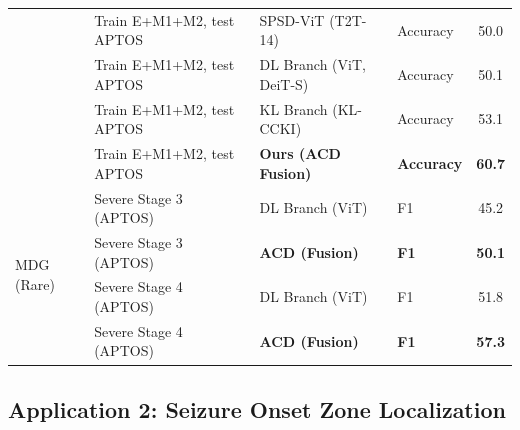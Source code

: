 \documentclass[runningheads]{llncs}
\begin{document}
\begin{table}[h]
\begin{tabular}{llllc}
  & Train E+M1+M2, test APTOS 
  & SPSD-ViT (T2T-14) & Accuracy & 50.0 \\
  & Train E+M1+M2, test APTOS 
  & DL Branch (ViT, DeiT-S) & Accuracy & 50.1 \\
  & Train E+M1+M2, test APTOS 
  & KL Branch (KL-CCKI) & Accuracy & 53.1 \\
  & Train E+M1+M2, test APTOS 
  & \textbf{Ours (ACD Fusion)} & \textbf{Accuracy} & \textbf{60.7} \\
\midrule
\multirow{4}{*}{MDG (Rare)} 
  & Severe Stage 3 (APTOS) 
  & DL Branch (ViT) & F1 & 45.2 \\
  & Severe Stage 3 (APTOS) 
  & \textbf{ACD (Fusion)} & \textbf{F1} & \textbf{50.1} \\
  & Severe Stage 4 (APTOS) 
  & DL Branch (ViT) & F1 & 51.8 \\
  & Severe Stage 4 (APTOS) 
  & \textbf{ACD (Fusion)} & \textbf{F1} & \textbf{57.3} \\
\bottomrule
\end{tabular}

\label{tab:dr_all_results}
\end{table}

\subsection{Application 2: Seizure Onset Zone Localization}
\end{document}
